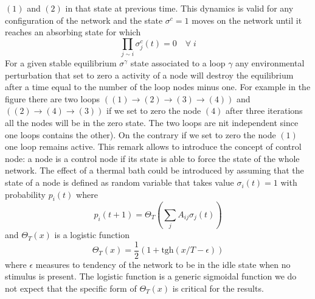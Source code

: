 $(1)$ and $(2)$ in that state at previous time. This dynamics is valid for any configuration of the network and the state $\sigma^c=1$
moves on the network until it reaches an absorbing state for which
$$
\prod_{j\sim i} \sigma^c_j(t)=0 \quad \forall \; i
$$
For a given stable equilibrium $\sigma^\gamma$ state associated to a loop $\gamma$ any environmental perturbation
that set to zero a activity of a node will destroy the equilibrium after a time equal to the number of the loop nodes minus one.
For example in the figure there are two loops $((1)\to (2)\to (3)\to (4))$ and $((2)\to(4)\to (3))$ if we set to zero the node 
$(4)$ after three iterations all the nodes will be in the zero state. The two loops are nit independent since one loops contains the other). On the contrary if we set to zero the node $(1)$ one loop remains active. This remark allows to introduce the concept of control node: a node is a control node if its state is able to 
force the state of the whole network. The effect of a thermal bath could be introduced by assuming that the state of a node
is defined as random variable that takes value $\sigma_i(t)=1$ with probability $p_i(t)$ where 
\begin{equation}
p_i(t+1)=\Theta_T\left (\sum_j A_{ij}\sigma_j(t)\right )
\label{stocdyn}
\end{equation}
and $\Theta_T(x)$ is a logistic function 
$$
\Theta_T(x)=\frac{1}{2}\left (1+\textrm{tgh}(x/T-\epsilon)\right )
$$
where $\epsilon$ measures to tendency of the network to be in the idle state when no stimulus is present.
The logistic function is a generic sigmoidal function we do not expect that the specific form of $\Theta_T(x)$ is critical for the results.
\par\noindent



